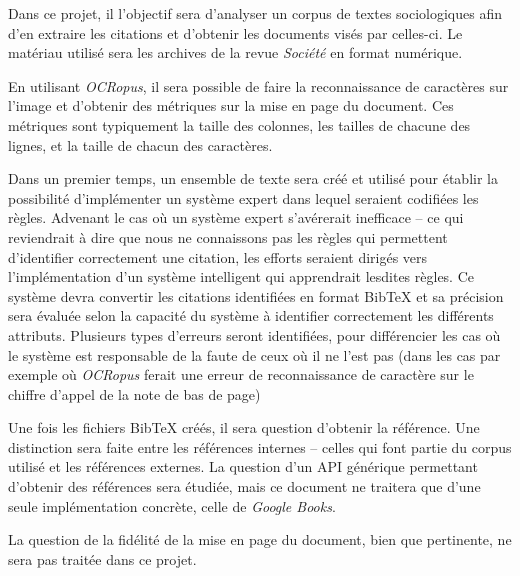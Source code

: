 Dans ce projet, il l'objectif sera d'analyser un corpus de textes sociologiques afin d'en extraire les citations et d'obtenir les documents visés par celles-ci. Le matériau utilisé sera les archives de la revue \emph{Société} en format numérique.

En utilisant \emph{OCRopus}, il sera possible de faire la reconnaissance de caractères sur l'image et d'obtenir des métriques sur la mise en page du document. Ces métriques sont typiquement la taille des colonnes, les tailles de chacune des lignes, et la taille de chacun des caractères.

Dans un premier temps, un ensemble de texte sera créé et utilisé pour établir la possibilité d'implémenter un système expert dans lequel seraient codifiées les règles. Advenant le cas où un système expert s'avérerait inefficace -- ce qui reviendrait à dire que nous ne connaissons pas les règles qui permettent d'identifier correctement une citation, les efforts seraient dirigés vers l'implémentation d'un système intelligent qui apprendrait lesdites règles. Ce système devra convertir les citations identifiées en format BibTeX et sa précision sera évaluée selon la capacité du système à identifier correctement les différents attributs. Plusieurs types d'erreurs seront identifiées, pour différencier les cas où le système est responsable de la faute de ceux où il ne l'est pas (dans les cas par exemple où \emph{OCRopus} ferait une erreur de reconnaissance de caractère sur le chiffre d'appel de la note de bas de page)

Une fois les fichiers BibTeX créés, il sera question d'obtenir la référence. Une distinction sera faite entre les références internes -- celles qui font partie du corpus utilisé et les références externes. La question d'un API générique permettant d'obtenir des références sera étudiée, mais ce document ne traitera que d'une seule implémentation concrète, celle de \emph{Google Books}.

La question de la fidélité de la mise en page du document, bien que pertinente, ne sera pas traitée dans ce projet. 
